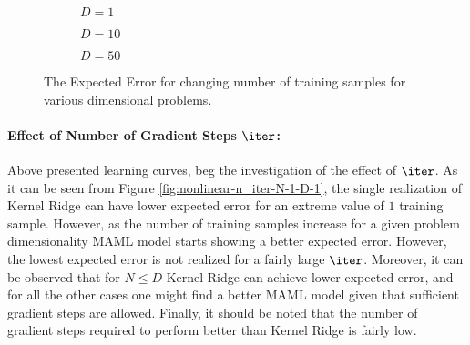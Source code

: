 \begin{figure}[!h]
  \centering
    \begin{subfigure}{0.3\textwidth}
      \centering
      \caption{$D=1$}
      \label{fig:nonlinear-N-D-1}
    \end{subfigure}
    \begin{subfigure}{0.3\textwidth}
      \centering
      \caption{$D=10$}
      \label{fig:nonlinear-N-D-10}
    \end{subfigure}
    \begin{subfigure}{0.3\textwidth}
      \centering
      \caption{$D=50$}
      \label{fig:nonlinear-N-D-50}
    \end{subfigure}
  \caption{The Expected Error for changing number of training samples for various dimensional problems.}\label{ref:nonlinear-N}
\end{figure}


\paragraph{Effect of Number of Gradient Steps $\iter$:} Above presented learning curves, beg the investigation of the effect of $\iter$.  As it can be seen from Figure \ref{fig:nonlinear-n_iter-N-1-D-1}, the single realization of Kernel Ridge can have lower expected error for an extreme value of $1$ training sample. However, as the number of training samples increase for a given problem dimensionality MAML model starts showing a better expected error. However, the lowest expected error is not realized for a fairly large $\iter$. Moreover, it can be observed that for $N\leq D$ Kernel Ridge can achieve lower expected error, and for all the other cases one might find a better MAML model given that sufficient gradient steps are allowed. Finally, it should be noted that the number of gradient steps required to perform better than Kernel Ridge is fairly low.

